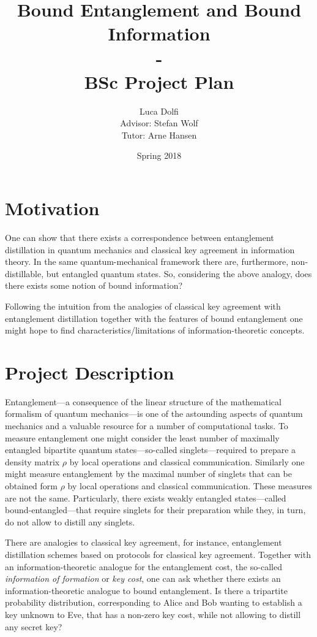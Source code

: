 \documentclass[titlepage]{article}
\title{Bound Entanglement and Bound Information \\ - \\ BSc Project Plan}
\author{Luca Dolfi\\ Advisor: Stefan Wolf \\ Tutor: Arne Hansen}
\date{Spring 2018}
\begin{document}
\maketitle
\section*{Motivation}
One can show that there exists a correspondence between entanglement distillation in quantum mechanics and classical key agreement in information theory. In the same quantum-mechanical framework there are, furthermore, non-distillable, but entangled quantum states. So, considering the above analogy, does there exists some notion of bound information?

Following the intuition from the analogies of classical key agreement with entanglement distillation together with the features of bound entanglement one might hope to find characteristics/limitations of information-theoretic concepts.

\section*{Project Description}
Entanglement---a consequence of the linear structure of the mathematical
formalism of quantum mechanics---is one of the astounding aspects of
quantum mechanics and a valuable resource for a number of computational
tasks.
To measure entanglement one might consider the least number of maximally
entangled bipartite quantum states---so-called singlets---required to
prepare a density matrix $\rho$ by local operations and classical
communication.
Similarly one might measure entanglement by the maximal number of
singlets that can be obtained form $\rho$ by local operations and
classical communication.
These measures are not the same. Particularly, there exists weakly
entangled states---called bound-entangled---that require singlets for
their preparation while they, in turn, do not allow to distill any singlets.

There are analogies to classical key agreement, for instance,
entanglement distillation schemes based on protocols for classical key
agreement.
Together with an information-theoretic analogue for the entanglement
cost, the so-called \emph{information of formation} or \emph{key cost},
one can ask whether there exists an information-theoretic analogue to
bound entanglement.
Is there a tripartite probability distribution, corresponding to Alice
and Bob wanting to establish a key unknown to Eve, that has a non-zero
key cost, while not allowing to distill any secret key?
\end{document}
